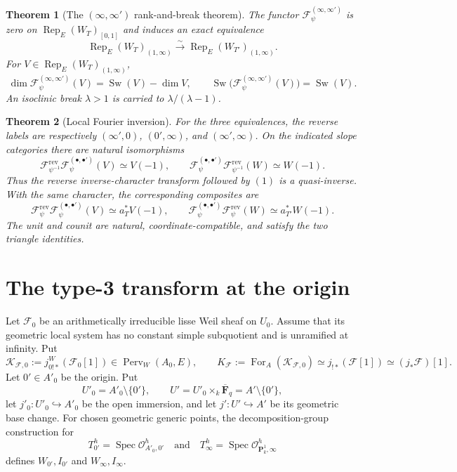 \documentclass[10pt]{article}
\newtheorem{theorem}{Theorem}[section]
\theoremstyle{definition}
\newcommand{\Fbar}{\overline{\mathbf F}_q}
\newcommand{\PervW}{\operatorname{Perv}_W}
\newcommand{\Rep}{\operatorname{Rep}}
\newcommand{\Sw}{\operatorname{Sw}}
\begin{document}
\begin{theorem}[The \((\infty,\infty')\) rank-and-break theorem]
The functor \(\mathcal F_\psi^{(\infty,\infty')}\) is zero on
\(\Rep_E(W_T)_{[0,1]}\) and induces an exact equivalence
\[
 \Rep_E(W_T)_{(1,\infty)}
 \xrightarrow{\sim}\Rep_E(W_{T'})_{(1,\infty)}.
\]
For \(V\in\Rep_E(W_T)_{(1,\infty)}\),
\[
 \dim\mathcal F_\psi^{(\infty,\infty')}(V)=\Sw(V)-\dim V,
 \qquad
 \Sw\bigl(\mathcal F_\psi^{(\infty,\infty')}(V)\bigr)=\Sw(V).
\]
An isoclinic break \(\lambda>1\) is carried to
\(\lambda/(\lambda-1)\).
\end{theorem}

\begin{theorem}[Local Fourier inversion]
For the three equivalences, the reverse labels are respectively
\((\infty',0)\), \((0',\infty)\), and
\((\infty',\infty)\).  On the indicated slope categories there are natural
isomorphisms
\[
 \mathcal F_{\psi^{-1}}^{\mathrm{rev}}
 \mathcal F_\psi^{(\bullet,\bullet')}(V)\simeq V(-1),
 \qquad
 \mathcal F_\psi^{(\bullet,\bullet')}
 \mathcal F_{\psi^{-1}}^{\mathrm{rev}}(W)\simeq W(-1).
\]
Thus the reverse inverse-character transform followed by \((1)\) is a
quasi-inverse.  With the same character, the corresponding composites are
\[
 \mathcal F_\psi^{\mathrm{rev}}
 \mathcal F_\psi^{(\bullet,\bullet')}(V)
 \simeq a_T^*V(-1),
 \qquad
 \mathcal F_\psi^{(\bullet,\bullet')}
 \mathcal F_\psi^{\mathrm{rev}}(W)
 \simeq a_{T'}^*W(-1).
\]
The unit and counit are natural, coordinate-compatible, and satisfy the
two triangle identities.
\end{theorem}

\section{The type-3 transform at the origin}

Let \(\mathcal F_0\) be an arithmetically irreducible lisse Weil sheaf on
\(U_0\).  Assume that its geometric local system has no constant simple
subquotient and is unramified at infinity.  Put
\[
 \mathcal K_{\mathcal F,0}:=j_{0!*}^W(\mathcal F_0[1])
       \in\PervW(A_0,E),\qquad
 K_{\mathcal F}:=\operatorname{For}_A(\mathcal K_{\mathcal F,0})
       \simeq j_{!*}(\mathcal F[1])\simeq(j_*\mathcal F)[1].
\]
Let \(0'\in A'_0\) be the origin.  Put
\[
 U'_0=A'_0\setminus\{0'\},\qquad
 U'=U'_0\times_k\Fbar=A'\setminus\{0'\},
\]
let \(j'_0:U'_0\hookrightarrow A'_0\) be the open immersion, and let
\(j':U'\hookrightarrow A'\) be its geometric base change.  For chosen
geometric generic points, the decomposition-group construction for
\[
 T_{0'}^h=\operatorname{Spec}\mathcal O^h_{A'_0,0'}
 \quad\text{and}\quad
 T_\infty^h=\operatorname{Spec}\mathcal O^h_{\mathbf P^1_k,\infty}
\]
defines \(W_{0'},I_{0'}\) and \(W_\infty,I_\infty\).
\end{document}
